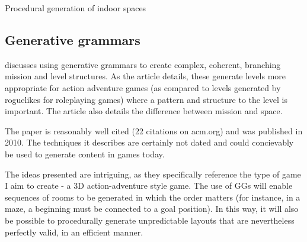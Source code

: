 \documentclass[review]{cmpreport}
\begin{document}
\begin{section}{Procedural generation of indoor spaces}
\subsection{Generative grammars}
\cite{Dormans:2010:ALD:1814256.1814257} discusses using generative grammars to create complex, coherent, branching mission and level structures. As the article details, these generate levels more appropriate for action adventure games (as compared to levels generated by roguelikes for roleplaying games) where a pattern and structure to the level is important. The article also details the difference between mission and space. \par
The paper is reasonably well cited (22 citations on acm.org) and was published in 2010. The techniques it describes are certainly not dated and could concievably be used to generate content in games today. \par  
The ideas presented are intriguing, as they specifically reference the type of game I aim to create - a 3D action-adventure style game. The use of GGs will enable sequences of rooms to be generated in which the order matters (for instance, in a maze, a beginning must be connected to a goal position). In this way, it will also be possible to procedurally generate unpredictable layouts that are nevertheless perfectly valid, in an efficient manner.


\end{section}
\end{document}
